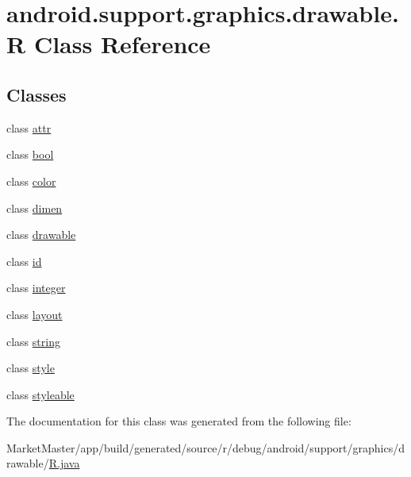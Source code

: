 \hypertarget{classandroid_1_1support_1_1graphics_1_1drawable_1_1R}{}\section{android.\+support.\+graphics.\+drawable.\+R Class Reference}
\label{classandroid_1_1support_1_1graphics_1_1drawable_1_1R}
\subsection*{Classes}
\begin{DoxyCompactItemize}
\item 
class \mbox{\hyperlink{classandroid_1_1support_1_1graphics_1_1drawable_1_1R_1_1attr}{attr}}
\item 
class \mbox{\hyperlink{classandroid_1_1support_1_1graphics_1_1drawable_1_1R_1_1bool}{bool}}
\item 
class \mbox{\hyperlink{classandroid_1_1support_1_1graphics_1_1drawable_1_1R_1_1color}{color}}
\item 
class \mbox{\hyperlink{classandroid_1_1support_1_1graphics_1_1drawable_1_1R_1_1dimen}{dimen}}
\item 
class \mbox{\hyperlink{classandroid_1_1support_1_1graphics_1_1drawable_1_1R_1_1drawable}{drawable}}
\item 
class \mbox{\hyperlink{classandroid_1_1support_1_1graphics_1_1drawable_1_1R_1_1id}{id}}
\item 
class \mbox{\hyperlink{classandroid_1_1support_1_1graphics_1_1drawable_1_1R_1_1integer}{integer}}
\item 
class \mbox{\hyperlink{classandroid_1_1support_1_1graphics_1_1drawable_1_1R_1_1layout}{layout}}
\item 
class \mbox{\hyperlink{classandroid_1_1support_1_1graphics_1_1drawable_1_1R_1_1string}{string}}
\item 
class \mbox{\hyperlink{classandroid_1_1support_1_1graphics_1_1drawable_1_1R_1_1style}{style}}
\item 
class \mbox{\hyperlink{classandroid_1_1support_1_1graphics_1_1drawable_1_1R_1_1styleable}{styleable}}
\end{DoxyCompactItemize}


The documentation for this class was generated from the following file\+:\begin{DoxyCompactItemize}
\item 
Market\+Master/app/build/generated/source/r/debug/android/support/graphics/drawable/\mbox{\hyperlink{debug_2android_2support_2graphics_2drawable_2R_8java}{R.\+java}}\end{DoxyCompactItemize}
